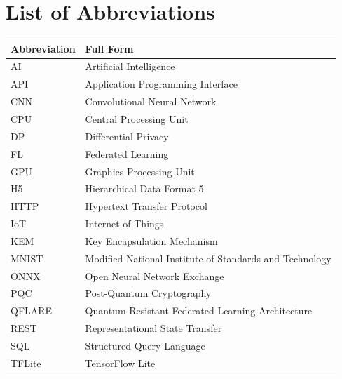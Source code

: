 \documentclass[12pt,a4paper]{article}
\begin{document}
\newpage
\listoffigures
\thispagestyle{plain}

\newpage
\listoftables
\thispagestyle{plain}

\newpage
\section*{List of Abbreviations}

\begin{table}[H]
\begin{tabular}{ll}
\textbf{Abbreviation} & \textbf{Full Form} \\
\toprule
AI & Artificial Intelligence \\
API & Application Programming Interface \\
CNN & Convolutional Neural Network \\
CPU & Central Processing Unit \\
DP & Differential Privacy \\
FL & Federated Learning \\
GPU & Graphics Processing Unit \\
H5 & Hierarchical Data Format 5 \\
HTTP & Hypertext Transfer Protocol \\
IoT & Internet of Things \\
KEM & Key Encapsulation Mechanism \\
MNIST & Modified National Institute of Standards and Technology \\
ONNX & Open Neural Network Exchange \\
PQC & Post-Quantum Cryptography \\
QFLARE & Quantum-Resistant Federated Learning Architecture \\
REST & Representational State Transfer \\
SQL & Structured Query Language \\
TFLite & TensorFlow Lite \\
\bottomrule
\end{tabular}
\end{table}

\newpage
\setcounter{page}{1}
\end{document}

